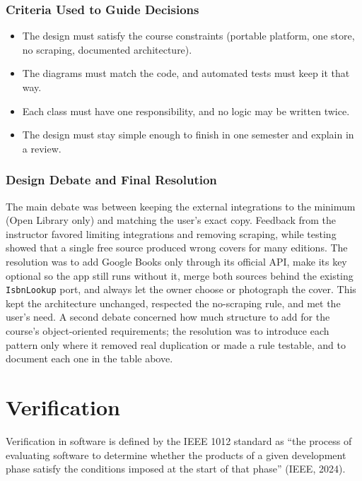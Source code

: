 \documentclass[12pt]{article}
\begin{document}
\subsubsection{Criteria Used to Guide Decisions}

\begin{itemize}
    \item The design must satisfy the course constraints (portable platform, one store, no scraping, documented architecture).
    \item The diagrams must match the code, and automated tests must keep it that way.
    \item Each class must have one responsibility, and no logic may be written twice.
    \item The design must stay simple enough to finish in one semester and explain in a review.
\end{itemize}

\subsubsection{Design Debate and Final Resolution}

The main debate was between keeping the external integrations to the minimum (Open Library only) and matching the user's exact copy. Feedback from the instructor favored limiting integrations and removing scraping, while testing showed that a single free source produced wrong covers for many editions. The resolution was to add Google Books only through its official API, make its key optional so the app still runs without it, merge both sources behind the existing \texttt{IsbnLookup} port, and always let the owner choose or photograph the cover. This kept the architecture unchanged, respected the no-scraping rule, and met the user's need. A second debate concerned how much structure to add for the course's object-oriented requirements; the resolution was to introduce each pattern only where it removed real duplication or made a rule testable, and to document each one in the table above.

\section{Verification}
\label{sec:verification}

Verification in software is defined by the IEEE 1012 standard as ``the process of evaluating software to determine whether the products of a given development phase satisfy the conditions imposed at the start of that phase'' (IEEE, 2024).
\end{document}
